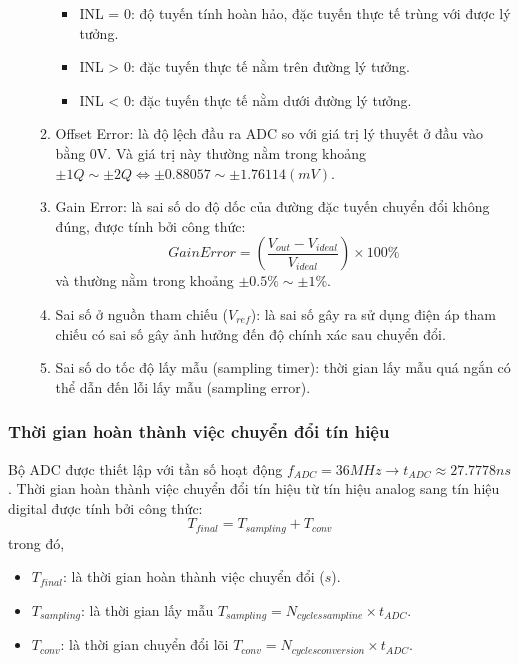 \begin{itemize}[label=-]
\begin{enumerate}[label = \alph*)]
				\begin{itemize}[label = +]
					\item INL = 0: độ tuyến tính hoàn hảo, đặc tuyến thực tế trùng với được lý tưởng.
					\item INL > 0: đặc tuyến thực tế nằm trên đường lý tưởng.
					\item INL < 0: đặc tuyến thực tế nằm dưới đường lý tưởng.
				\end{itemize}
			\item Offset Error: là độ lệch đầu ra ADC so với giá trị lý thuyết ở đầu vào bằng 0V. Và giá trị này thường nằm trong khoảng $\pm 1Q \sim \pm 2Q \Leftrightarrow \pm 0.88057 \sim \pm 1.76114 (mV)$.
			\item Gain Error: là sai số do độ dốc của đường đặc tuyến chuyển đổi không đúng, được tính bởi công thức: \[Gain Error = \left( \dfrac{V_{out} - V_{ideal}}{V_{ideal}} \right) \times 100\%\] và thường nằm trong khoảng $\pm 0.5\% \sim \pm 1\%$.
			\item Sai số ở nguồn tham chiếu ($V_{ref}$): là sai số gây ra sử dụng điện áp tham chiếu có sai số gây ảnh hưởng đến độ chính xác sau chuyển đổi.
			\item Sai số do tốc độ lấy mẫu (sampling timer): thời gian lấy mẫu quá ngắn có thể dẫn đến lỗi lấy mẫu (sampling error).
		\end{enumerate}
\end{itemize}

\subsubsection{Thời gian hoàn thành việc chuyển đổi tín hiệu}

Bộ ADC được thiết lập với tần số hoạt động $f_{ADC} = 36MHz \rightarrow t_{ADC} \approx 27.7778 ns$. Thời gian hoàn thành việc chuyển đổi tín hiệu từ tín hiệu analog sang tín hiệu digital được tính bởi công thức: \[T_{final} = T_{sampling} + T_{conv}\] trong đó,

\begin{itemize}[label= -]
	\item $T_{final}$: là thời gian hoàn thành việc chuyển đổi ($s$).
	\item $T_{sampling}$: là thời gian lấy mẫu $T_{sampling} = N_{cycles sampline} \times t_{ADC}$.
	\item $T_{conv}$: là thời gian chuyển đổi lõi $T_{conv} = N_{cycles conversion} \times t_{ADC}$.
\end{itemize}

